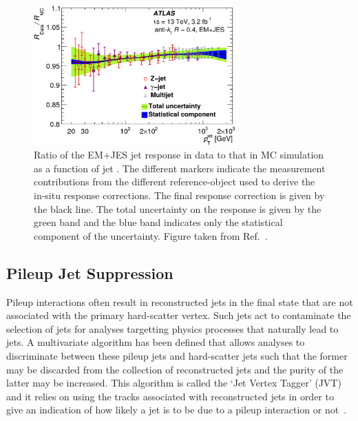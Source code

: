 \begin{figure}[!htb]
    \begin{center}
        \includegraphics[width=0.7\textwidth]{figures/chapter3/jets/jet_corr_insitu}
        \caption{
            Ratio of the EM+JES jet response in data to that in MC simulation as a function of jet \pT.
            The different markers indicate the measurement contributions from the different
            reference-object used to derive the in-situ response corrections.
            The final response correction is given by the black line.
            The total uncertainty on the response is given by the green band and the blue band
            indicates only the statistical component of the uncertainty.
            Figure taken from Ref.~\cite{Aaboud:2017jcu}.
        }
        \label{fig:jet_corr_insitu}
    \end{center}
\end{figure}
\FloatBarrier

%
%
\subsection{Pileup Jet Suppression}
\label{sec:jvt}

Pileup interactions often result in reconstructed jets in the final state that are not associated with the
primary hard-scatter vertex.
Such jets act to contaminate the selection of jets for analyses targetting physics processes that
naturally lead to jets.
A multivariate algorithm has been defined that allows analyses to discriminate between these pileup jets
and hard-scatter jets such that the former may be discarded from the collection of reconstructed
jets and the purity of the latter may be increased.
This algorithm is called the `Jet Vertex Tagger' (JVT) and it relies on using the tracks
associated with reconstructed jets in order to give an indication of how likely a jet
is to be due to a pileup interaction or not~\cite{JVT}.

